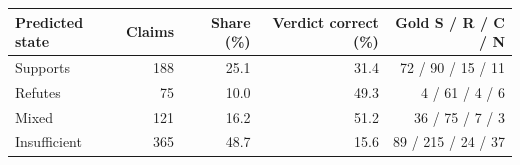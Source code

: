 \begin{tabular}{@{}lrrrr@{}}
\toprule
Predicted state & Claims & Share (\%) & Verdict correct (\%) & Gold S / R / C / N \\
\midrule
Supports & 188 & 25.1 & 31.4 & 72 / 90 / 15 / 11 \\
Refutes & 75 & 10.0 & 49.3 & 4 / 61 / 4 / 6 \\
Mixed & 121 & 16.2 & 51.2 & 36 / 75 / 7 / 3 \\
Insufficient & 365 & 48.7 & 15.6 & 89 / 215 / 24 / 37 \\
\bottomrule
\end{tabular}
